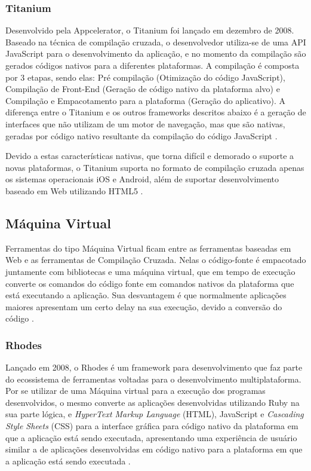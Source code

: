 \subsubsection{Titanium}
Desenvolvido pela Appcelerator, o Titanium foi lançado em dezembro de 2008. Baseado na técnica de compilação cruzada, o desenvolvedor utiliza-se de uma API JavaScript para o desenvolvimento da aplicação, e no momento da compilação são gerados códigos nativos para a diferentes plataformas. A compilação é composta por 3 etapas, sendo elas: Pré compilação (Otimização do código JavaScript), Compilação de Front-End (Geração de código nativo da plataforma alvo) e Compilação e Empacotamento para a plataforma (Geração do aplicativo). A diferença entre o Titanium e os outros frameworks descritos abaixo é a geração de interfaces que não utilizam de um motor de navegação, mas que são nativas, geradas por código nativo resultante da compilação do código JavaScript
\cite{CrossPlatformMobileDevelopment2011}.

Devido a estas características nativas, que torna difícil e demorado o suporte a novas plataformas, o Titanium suporta no formato de compilação cruzada apenas os sistemas operacionais iOS e Android, além de suportar desenvolvimento baseado em Web utilizando HTML5
\cite{appceleratorTitanium}.

\subsection{Máquina Virtual}
Ferramentas do tipo Máquina Virtual ficam entre as ferramentas baseadas em Web e as ferramentas de Compilação Cruzada. Nelas o código-fonte é empacotado juntamente com bibliotecas e uma máquina virtual, que em tempo de execução converte os comandos do código fonte em comandos nativos da plataforma que está executando a aplicação. Sua desvantagem é que normalmente aplicações maiores apresentam um certo delay na sua execução, devido a conversão do código
\cite{CrossPlatformMobileDevelopment2011}.

\subsubsection{Rhodes}
Lançado em 2008, o Rhodes é um framework para desenvolvimento que faz parte do ecossistema de ferramentas voltadas para o desenvolvimento multiplataforma. Por se utilizar de uma Máquina virtual para a execução dos programas desenvolvidos, o mesmo converte as aplicações desenvolvidas utilizando Ruby na sua parte lógica, e \emph{HyperText Markup Language} (HTML), JavaScript e \emph{Cascading Style Sheets} (CSS) para a interface gráfica para código nativo da plataforma em que a aplicação está sendo executada, apresentando uma experiência de usuário similar a de aplicações desenvolvidas em código nativo para a plataforma em que a aplicação está sendo executada
\cite{CrossPlatformMobileDevelopment2011}.

